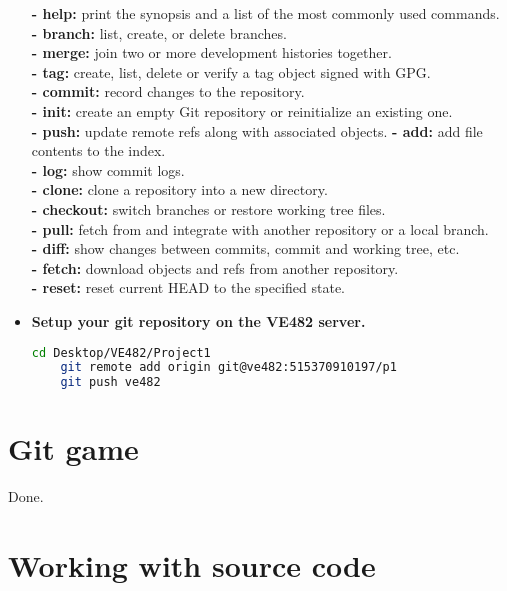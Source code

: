 \documentclass{article}
\begin{document}
\begin{spacing}{2}
\begin{itemize}
    \textbf{- help:} print the synopsis and a list of the most commonly used commands.\\
    \textbf{- branch:} list, create, or delete branches.\\
    \textbf{- merge:} join two or more development histories together.\\
    \textbf{- tag:} create, list, delete or verify a tag object signed with GPG.\\
    \textbf{- commit:} record changes to the repository.\\
    \textbf{- init:} create an empty Git repository or reinitialize an existing one.\\
    \textbf{- push:} update remote refs along with associated objects.
    \textbf{- add:} add file contents to the index.\\
    \textbf{- log:} show commit logs.\\
    \textbf{- clone:} clone a repository into a new directory.\\
    \textbf{- checkout:} switch branches or restore working tree files.\\
    \textbf{- pull:} fetch from and integrate with another repository or a local branch.\\
    \textbf{- diff:} show changes between commits, commit and working tree, etc.\\
    \textbf{- fetch:} download objects and refs from another repository.\\
    \textbf{- reset:} reset current HEAD to the specified state.
    \item \textbf{Setup your git repository on the VE482 server.}
    \begin{lstlisting}[language=bash]
	cd Desktop/VE482/Project1
	git remote add origin git@ve482:515370910197/p1
	git push ve482
	\end{lstlisting}
    \end{itemize}
\section{Git game}
Done.
\section{Working with source code}

\end{spacing}
\end{document}
